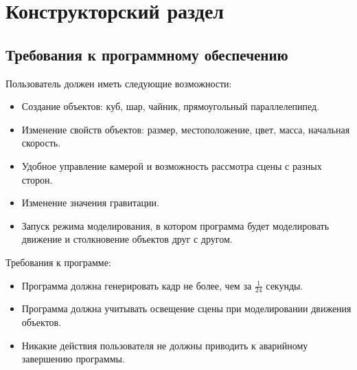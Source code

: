 
\newpage
\section{Конструкторский раздел}

\subsection{Требования к программному обеспечению}

Пользователь должен иметь следующие возможности:
\begin{itemize}
    \item Создание объектов: куб, шар, чайник, прямоугольный параллелепипед.
    \item Изменение свойств объектов: размер, местоположение, цвет, масса, начальная скорость.
    \item Удобное управление камерой и возможность рассмотра сцены с разных сторон.
    \item Изменение значения гравитации.
    \item Запуск режима моделирования, в котором программа будет моделировать движение и столкновение объектов друг с другом.
\end{itemize}

Требования к программе:
\begin{itemize}
    \item Программа должна генерировать кадр не более, чем за $\frac{1}{24}$ секунды.
    \item Программа должна учитывать освещение сцены при моделировании движения объектов.
    \item Никакие действия пользователя не должны приводить к аварийному завершению программы.
\end{itemize}



